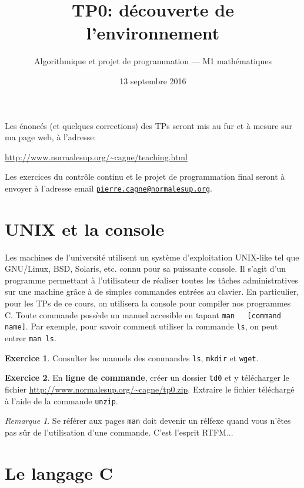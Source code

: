 \documentclass[10pt,french,a4paper]{article}
\title{\sffamily TP0: découverte de l'environnement}
\date{13 septembre 2016}
\author{Algorithmique et projet de programmation --- M1 mathématiques}
\theoremstyle{definition}
\newtheorem{exercise}{Exercice}
\theoremstyle{remark}
\newtheorem*{remark}{Remarque}
\newcommand{\shell}[1]{\lstinline[style=sh]|#1|}
\begin{document}
\maketitle

Les énoncés (et quelques corrections) des TPs seront mis au fur et à
mesure sur ma page web, à l'adresse:
\begin{center}
  \url{http://www.normalesup.org/~cagne/teaching.html}
\end{center}
Les exercices du contrôle continu et le projet de programmation final
seront à envoyer à l'adresse email
\href{mailto:pierre.cagne@normalesup.org}
{\nolinkurl{pierre.cagne@normalesup.org}}.

\section{UNIX et la console}
\label{sec:unix}

Les machines de l’université utilisent un système d’exploitation
UNIX-like tel que GNU/Linux, BSD, Solaris, etc. connu pour sa
puissante console. Il s’agit d’un programme permettant à l’utilisateur
de réaliser toutes les tâches administratives sur une machine grâce à
de simples commandes entrées au clavier. En particulier, pour les TPs
de ce cours, on utilisera la console pour compiler nos programmes C.
Toute commande possède un manuel accesible en tapant \shell{man
  [command name]}. Par exemple, pour savoir comment utiliser la
commande \shell{ls}, on peut entrer \shell{man ls}.
\begin{exercise}
  Consulter les manuels des commandes \shell{ls}, \shell{mkdir} et
  \shell{wget}.
\end{exercise}

\begin{exercise}
  En {\bf ligne de commande}, créer un dossier \shell{td0} et y
  télécharger le fichier
  \url{http://www.normalesup.org/~cagne/tp0.zip}. Extraire le fichier
  téléchargé à l'aide de la commande \shell{unzip}.
\end{exercise}

\begin{remark}
  Se référer aux pages \shell{man} doit devenir un rélfexe quand vous
  n'êtes pas sûr de l'utilisation d'une commande. C'est l'esprit
  RTFM...
\end{remark}

\section{Le langage C}
\label{sec:c-lang}
\end{document}
